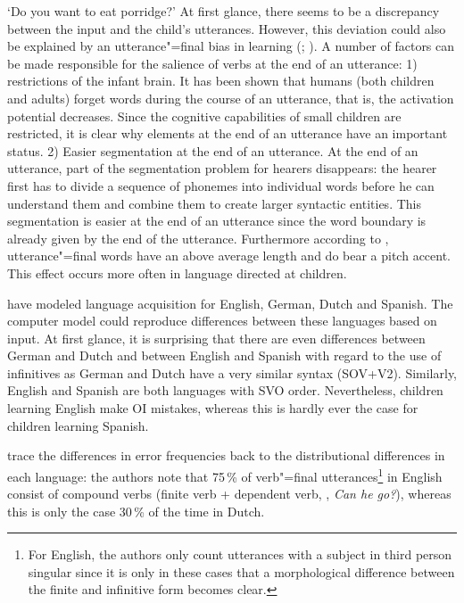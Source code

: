 \glt `Do you want to eat porridge?'
\z
At first glance, there seems to be a discrepancy between the input and the child's utterances.
However, this deviation could also be explained by an utterance"=final bias in learning (\citealp{WKG2001a}; \citealp*{FPG2006a}).
A number of factors can be made responsible for the salience of verbs at the end of an utterance:
1) restrictions of the infant brain. It has been shown that humans (both children and adults) forget words during the course of an
utterance, that is, the activation potential decreases. Since the cognitive capabilities of small children are restricted,
it is clear why elements at the end of an utterance have an important status. 2) Easier segmentation at
the end of an utterance. At the end of an utterance, part of the segmentation problem for hearers disappears:
the hearer first has to divide a sequence of phonemes into individual words before he can understand them and
combine them to create larger syntactic entities.
This segmentation is easier at the end of an utterance since the word boundary is already given by the end of the utterance.
Furthermore according to \citet*[]{WKG2001a}, utterance"=final words have an above average length and do bear a pitch
accent. This effect occurs more often in language directed at children.

\citet*{FPAG2007a} have modeled language acquisition for English, German, Dutch and Spanish.
The computer model could reproduce differences between these languages based on input. At first glance, it
is surprising that there are even differences between German and Dutch and between English and Spanish with regard to the use of infinitives as
German and Dutch have a very similar syntax (SOV+V2). Similarly, English and Spanish are both languages with SVO order.
Nevertheless, children learning English make OI mistakes, whereas this is hardly ever the case for children learning Spanish.

\citet*{FPAG2007a} trace the differences in error frequencies back to the distributional differences in each language:
the authors note that 75\,\% of verb"=final utterances\footnote{
	For English, the authors only count utterances with a subject in third person singular since it is only in these cases
	that a morphological difference between the finite and infinitive form becomes clear.%
}
in English consist of compound verbs (finite verb + dependent verb, \eg, \emph{Can he go?}), whereas this is only the case
30\,\% of the time in Dutch.

